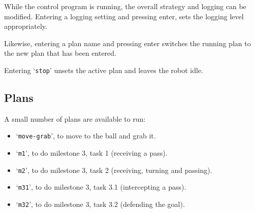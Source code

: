 ﻿\documentclass[12pt,a4paper]{article}
\begin{document}
While the control program is running, the overall strategy and logging can be modified. 
Entering a logging setting and pressing enter, sets the logging level appropriately.

Likewise, entering a plan name and pressing enter switches the running plan to the new plan that has been entered. 

Entering `\texttt{stop}' unsets the active plan and leaves the robot idle.

\subsection{Plans}

A small number of plans are available to run:

\begin{itemize}
    \item `\texttt{move-grab}', to move to the ball and grab it.
    \item `\texttt{m1}', to do milestone 3, task 1 (receiving a pass).
    \item `\texttt{m2}', to do milestone 3, task 2 (receiving, turning and passing).
    \item `\texttt{m31}', to do milestone 3, task 3.1 (intercepting a pass).
    \item `\texttt{m32}', to do milestone 3, task 3.2 (defending the goal).
\end{itemize}








\end{document}
